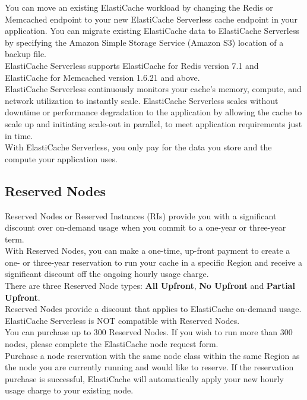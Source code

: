 \documentclass[12pt, letterpaper, twoside]{article}
\begin{document}
You can move an existing ElastiCache workload by changing the Redis or Memcached endpoint to your new ElastiCache Serverless 
cache endpoint in your application. You can migrate existing ElastiCache data to ElastiCache Serverless by specifying the 
Amazon Simple Storage Service (Amazon S3) location of a backup file.\\

ElastiCache Serverless supports ElastiCache for Redis version 7.1 and ElastiCache for Memcached version 1.6.21 and above.\\

ElastiCache Serverless continuously monitors your cache’s memory, compute, and network utilization to instantly scale. 
ElastiCache Serverless scales without downtime or performance degradation to the application by allowing the cache to scale 
up and initiating scale-out in parallel, to meet application requirements just in time.\\

With ElastiCache Serverless, you only pay for the data you store and the compute your application uses.\\

\subsection{Reserved Nodes}
Reserved Nodes or Reserved Instances (RIs) provide you with a significant discount over on-demand usage when you commit to a 
one-year or three-year term.\\
With Reserved Nodes, you can make a one-time, up-front payment to create a one- or three-year reservation to run your 
cache in a specific Region and receive a significant discount off the ongoing hourly usage charge.\\

There are three Reserved Node types: \textbf{All Upfront}, \textbf{No Upfront} and \textbf{Partial Upfront}.\\
Reserved Nodes provide a discount that applies to ElastiCache on-demand usage. ElastiCache Serverless is NOT compatible with 
Reserved Nodes.\\

You can purchase up to 300 Reserved Nodes. If you wish to run more than 300 nodes, please complete the ElastiCache 
node request form.\\

Purchase a node reservation with the same node class within the same Region as the node you are currently running and 
would like to reserve. If the reservation purchase is successful, ElastiCache will automatically apply your new hourly 
usage charge to your existing node.\\
\end{document}
